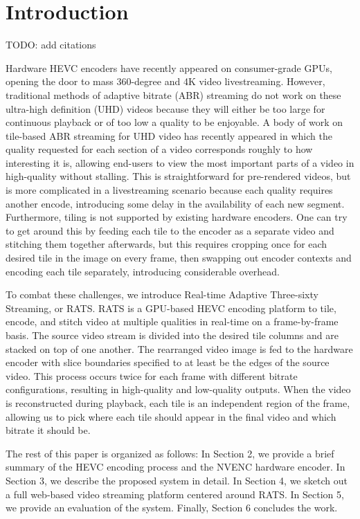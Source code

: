
\section{Introduction}

TODO: add citations

Hardware HEVC encoders have recently appeared on consumer-grade GPUs, opening the door to mass 360-degree and 4K video livestreaming. However, traditional methods of adaptive bitrate (ABR) streaming do not work on these ultra-high definition (UHD) videos because they will either be too large for continuous playback or of too low a quality to be enjoyable. A body of work on tile-based ABR streaming for UHD video has recently appeared in which the quality requested for each section of a video corresponds roughly to how interesting it is, allowing end-users to view the most important parts of a video in high-quality without stalling. This is straightforward for pre-rendered videos, but is more complicated in a livestreaming scenario because each quality requires another encode, introducing some delay in the availability of each new segment. Furthermore, tiling is not supported by existing hardware encoders. One can try to get around this by feeding each tile to the encoder as a separate video and stitching them together afterwards, but this requires cropping once for each desired tile in the image on every frame, then swapping out encoder contexts and encoding each tile separately, introducing considerable overhead.

To combat these challenges, we introduce Real-time Adaptive Three-sixty Streaming, or RATS. RATS is a GPU-based HEVC encoding platform to tile, encode, and stitch video at multiple qualities in real-time on a frame-by-frame basis. The source video stream is divided into the desired tile columns and are stacked on top of one another. The rearranged video image is fed to the hardware encoder with slice boundaries specified to at least be the edges of the source video. This process occurs twice for each frame with different bitrate configurations, resulting in high-quality and low-quality outputs. When the video is reconstructed during playback, each tile is an independent region of the frame, allowing us to pick where each tile should appear in the final video and which bitrate it should be.

The rest of this paper is organized as follows: In Section 2, we provide a brief summary of the HEVC encoding process and the NVENC hardware encoder. In Section 3, we describe the proposed system in detail. In Section 4, we sketch out a full web-based video streaming platform centered around RATS. In Section 5, we provide an evaluation of the system. Finally, Section 6 concludes the work.

